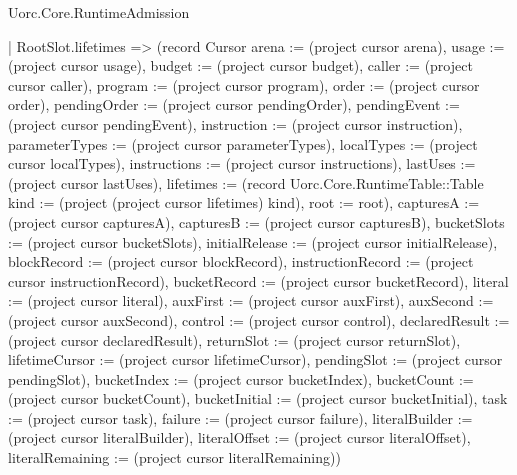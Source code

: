 \begin{lexlean}{Uorc.Core.RuntimeAdmission}
\begin{semanticmodule}
{    | RootSlot.lifetimes => (record Cursor {arena := (project cursor arena), usage := (project cursor usage), budget := (project cursor budget), caller := (project cursor caller), program := (project cursor program), order := (project cursor order), pendingOrder := (project cursor pendingOrder), pendingEvent := (project cursor pendingEvent), instruction := (project cursor instruction), parameterTypes := (project cursor parameterTypes), localTypes := (project cursor localTypes), instructions := (project cursor instructions), lastUses := (project cursor lastUses), lifetimes := (record Uorc.Core.RuntimeTable::Table {kind := (project (project cursor lifetimes) kind), root := root}), capturesA := (project cursor capturesA), capturesB := (project cursor capturesB), bucketSlots := (project cursor bucketSlots), initialRelease := (project cursor initialRelease), blockRecord := (project cursor blockRecord), instructionRecord := (project cursor instructionRecord), bucketRecord := (project cursor bucketRecord), literal := (project cursor literal), auxFirst := (project cursor auxFirst), auxSecond := (project cursor auxSecond), control := (project cursor control), declaredResult := (project cursor declaredResult), returnSlot := (project cursor returnSlot), lifetimeCursor := (project cursor lifetimeCursor), pendingSlot := (project cursor pendingSlot), bucketIndex := (project cursor bucketIndex), bucketCount := (project cursor bucketCount), bucketInitial := (project cursor bucketInitial), task := (project cursor task), failure := (project cursor failure), literalBuilder := (project cursor literalBuilder), literalOffset := (project cursor literalOffset), literalRemaining := (project cursor literalRemaining)})
}
\end{semanticmodule}
\end{lexlean}
